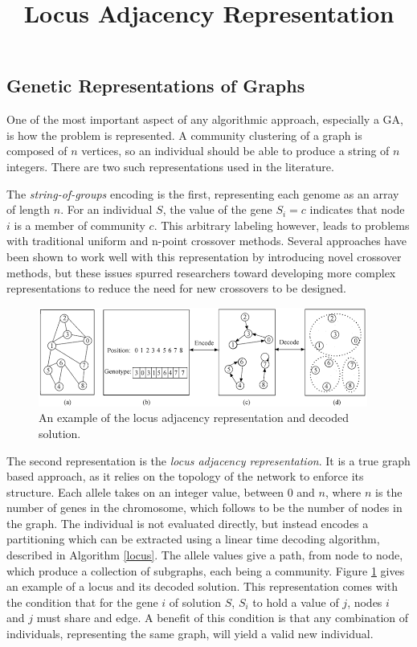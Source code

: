 \subsection{Genetic Representations of Graphs}
One of the most important aspect of any algorithmic approach, especially a GA, is how the problem is represented. A community clustering of a graph is composed of $n$ vertices, so an individual should be able to produce a string of $n$ integers. There are two such representations used in the literature. 

The \textit{string-of-groups} encoding is the first, representing each genome as an array of length $n$. For an individual $S$, the value of the gene $S_i=c$ indicates that node $i$ is a member of community $c$. This arbitrary labeling however, leads to problems with traditional uniform and n-point crossover methods. Several approaches have been shown to work well with this representation by introducing novel crossover methods\cite{Tasgin2006}, but these issues spurred researchers toward developing more complex representations to reduce the need for new crossovers to be designed.
\begin{figure}
	\title{Locus Adjacency Representation}
	\begin{center}
		\includegraphics[scale=1.]{images/locus_img.png}
	\end{center}
	\caption{An example of the locus adjacency representation and decoded solution.}
	\label{locus_img}
\end{figure}


The second representation is the \textit{locus adjacency representation}. It is a true graph based approach, as it relies on the topology of the network to enforce its structure. Each allele takes on an integer value, between 0 and $n$, where $n$ is the number of genes in the chromosome, which follows to be the number of nodes in the graph. The individual is not evaluated directly, but instead encodes a partitioning which can be extracted using a linear time decoding algorithm, described in Algorithm \ref{locus}. The allele values give a path, from node to node, which produce a collection of subgraphs, each being a community. Figure \ref{locus_img} gives an example of a locus and its decoded solution. This representation comes with the condition that for the gene $i$ of solution $S$, $S_i$ to hold a value of $j$, nodes $i$ and $j$ must share and edge. A benefit of this condition is that any combination of individuals, representing the same graph, will yield a valid new individual.

